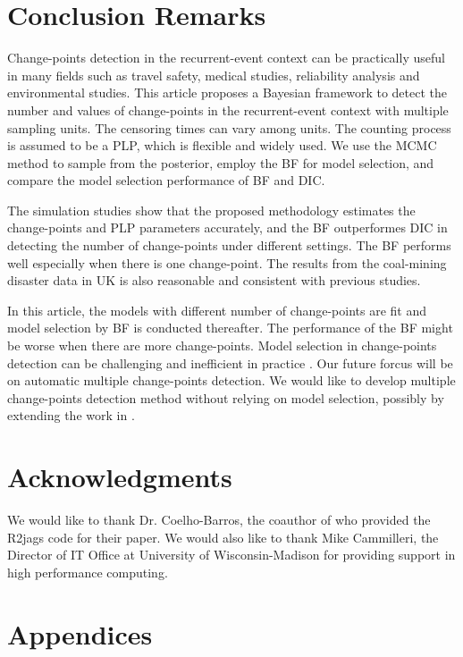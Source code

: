 \documentclass[12pt]{article}
\numberwithin{equation}{section}
\begin{document}
\section{Conclusion Remarks}\label{sec:discussion}
Change-points detection in the recurrent-event context can be practically useful in many fields such as travel safety, medical studies, reliability analysis and environmental studies.  This article proposes a Bayesian framework to detect the number and values of change-points in the recurrent-event context with multiple sampling units. The censoring times can vary among units. The counting process is assumed to be a PLP, which is flexible and widely used.  We use the MCMC method to sample from the posterior, employ the BF for model selection, and compare the model selection performance of BF and DIC. 

The simulation studies show that the proposed methodology estimates the change-points and PLP parameters accurately, and the BF outperformes DIC in detecting the number of change-points under different settings.  The BF performs well especially when there is one change-point. The results from the coal-mining disaster data in UK is also reasonable and consistent with previous studies.

In this article, the models with different number of change-points are fit and model selection by BF is conducted thereafter. The performance of the BF might be worse when there are more change-points.  Model selection in change-points detection can be challenging and inefficient in practice \citep{Ruggieri2013}. Our future forcus will be on automatic multiple change-points detection. We would like to develop multiple change-points detection method without relying on model selection, possibly by extending the work in \citet{Ruggieri2013}. 


\section{Acknowledgments}
We would like to thank Dr. Coelho-Barros, the coauthor of \citet{Achcar2016} who provided the R2jags code for their paper. We would also like to thank Mike Cammilleri, the Director of IT Office at University of Wisconsin-Madison for providing support in high performance computing.


\section*{Appendices}
\end{document}
